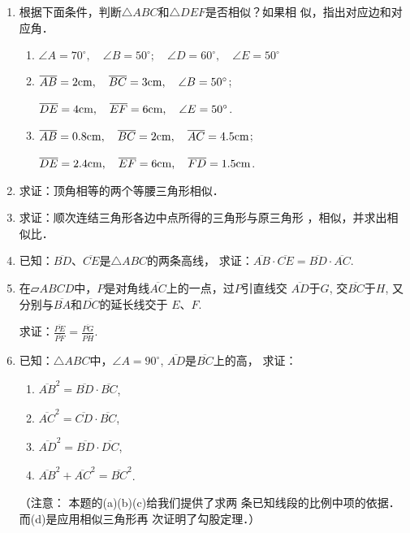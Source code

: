\begin{ex}
\begin{enumerate}
    \item 根据下面条件，判断$\triangle ABC$和$\triangle DEF$是否相似？如果相
    似，指出对应边和对应角．
\begin{enumerate}
    \item $\angle A=70^{\circ},\quad \angle B=50^{\circ};\quad \angle D=60^{\circ},\quad \angle E=50^{\circ}$
    \item $\overline{AB}=2{\rm cm},\quad \overline{BC}=3{\rm cm},\quad \angle B=50^{\circ}$; 
    
    $\overline{DE}=4{\rm cm},\quad \overline{EF}=6{\rm cm},\quad \angle E=50^{\circ}$.
    \item $\overline{AB}=0.8{\rm cm},\quad \overline{BC}=2{\rm cm},\quad \overline{AC}=4.5{\rm cm}$; 
    
    $\overline{DE}=2.4{\rm cm},\quad \overline{EF}=6{\rm cm},\quad \overline{FD}=1.5{\rm cm}$.
\end{enumerate}

    \item 求证：顶角相等的两个等腰三角形相似．
    \item 求证：顺次连结三角形各边中点所得的三角形与原三角形
    ，相似，并求出相似比．
    \item 已知：$\overline{BD}$、$\overline{CE}$是$\triangle ABC$的两条高线，
    求证：$\overline{AB}\cdot \overline{CE}=\overline{BD}\cdot \overline{AC}$.

\item 在$\parallelogram{ABCD}$中，$P$是对角线$\overline{AC}$上的一点，过$P$引直线交
$\overline{AD}$于$G$, 交$\overline{BC}$于$H$, 又分别与$\overline{BA}$和$\overline{DC}$的延长线交于
$E$、$F$.

求证：$\frac{\overline{PE}}{\overline{PF}}=\frac{\overline{PG}}{\overline{PH}}$.

\item 已知：$\triangle ABC$中，$\angle A=90^{\circ}$, $\overline{AD}$是$\overline{BC}$上的高，
求证：
\begin{multicols}{2}
\begin{enumerate}
    \item $\overline{AB}^2=\overline{BD}\cdot \overline{BC}$,  
    \item $\overline{AC}^2=\overline{CD}\cdot \overline{BC}$, 
    \item $\overline{AD}^2=\overline{BD}\cdot \overline{DC}$, 
    \item $\overline{AB}^2+\overline{AC}^2=\overline{BC}^2$.
\end{enumerate}
\end{multicols}
（注意： 本题的(a)(b)(c)给我们提供了求两
条已知线段的比例中项的依据．而(d)是应用相似三角形再
次证明了勾股定理．）
\end{enumerate}
\end{ex}

